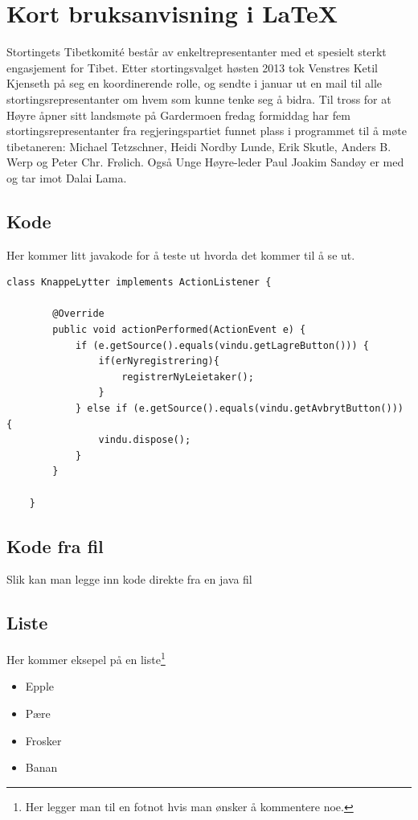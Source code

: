 \chapter{Kort bruksanvisning i \LaTeX{}}

Stortingets Tibetkomité består av enkeltrepresentanter med et spesielt sterkt 
engasjement for Tibet. Etter stortingsvalget høsten 2013 tok Venstres Ketil 
Kjenseth på seg en koordinerende rolle, og sendte i januar ut en mail til alle 
stortingsrepresentanter om hvem som kunne tenke seg å bidra.
Til tross for at Høyre åpner sitt landsmøte på Gardermoen fredag formiddag har 
fem stortingsrepresentanter fra regjeringspartiet funnet plass i programmet til 
å møte tibetaneren: Michael Tetzschner, Heidi Nordby Lunde, Erik Skutle, Anders 
B. Werp og Peter Chr. Frølich. Også Unge Høyre-leder Paul Joakim Sandøy er med 
og tar imot Dalai Lama.

\section{Kode}
Her kommer litt javakode for å teste ut hvorda det kommer til å se ut.

\begin{lstlisting}[title=Eksempelkode, caption=Koden teller til 1000, label=brakode]
class KnappeLytter implements ActionListener {

        @Override
        public void actionPerformed(ActionEvent e) {
            if (e.getSource().equals(vindu.getLagreButton())) {
                if(erNyregistrering){
                    registrerNyLeietaker();
                }
            } else if (e.getSource().equals(vindu.getAvbrytButton())) {
                vindu.dispose();
            }
        }

    }
\end{lstlisting}


\section{Kode fra fil}
Slik kan man legge inn kode direkte fra en java fil





\section{Liste}
Her kommer eksepel på en liste\footnote{Her legger man til en fotnot hvis man ønsker å kommentere noe.}
\begin{itemize}
 \item Epple
 \item Pære
 \item Frosker
 \item Banan
\end{itemize}



